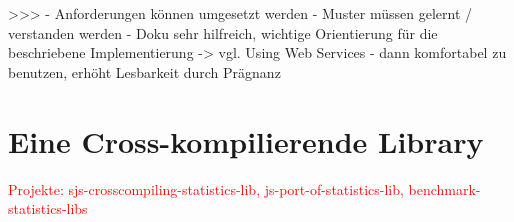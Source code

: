 \documentclass[a4paper, 12pt, hidelinks, listof=totoc, listoftables=totoc, bibliography=totoc]{scrreprt}
\newcommand{\TODO}[1]{\textcolor{red}{#1}\newline}
\begin{document}
>>>
- Anforderungen können umgesetzt werden
- Muster müssen gelernt / verstanden werden
- Doku sehr hilfreich, wichtige Orientierung für die beschriebene Implementierung -> vgl. Using Web Services \cite[\#UsingWebServices]{haoyi.HOS}
- dann komfortabel zu benutzen, erhöht Lesbarkeit durch Prägnanz




%

\section{Eine Cross-kompilierende Library}


\TODO{Projekte: sjs-crosscompiling-statistics-lib, js-port-of-statistics-lib, benchmark-statistics-libs}
\end{document}
